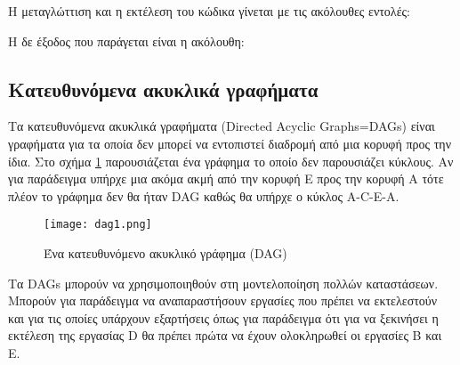 





Η μεταγλώττιση και η εκτέλεση του κώδικα γίνεται με τις ακόλουθες εντολές:



Η δε έξοδος που παράγεται είναι η ακόλουθη:



\subsection{Κατευθυνόμενα ακυκλικά γραφήματα}
Τα κατευθυνόμενα ακυκλικά γραφήματα (Directed Acyclic Graphs=DAGs) είναι γραφήματα για τα οποία δεν μπορεί να εντοπιστεί διαδρομή από μια κορυφή προς την ίδια. Στο σχήμα \ref{fig:dag1} παρουσιάζεται ένα γράφημα το οποίο δεν παρουσιάζει κύκλους. Αν για παράδειγμα υπήρχε μια ακόμα ακμή από την κορυφή E προς την κορυφή A τότε πλέον το γράφημα δεν θα ήταν DAG καθώς θα υπήρχε ο κύκλος A-C-E-A.

\begin{figure}[ht]
	\centering
	\texttt{[image: dag1.png]}
	\caption{Ένα κατευθυνόμενο ακυκλικό γράφημα (DAG)}
	\label{fig:dag1}
\end{figure}

Τα DAGs μπορούν να χρησιμοποιηθούν στη μοντελοποίηση πολλών καταστάσεων. Μπορούν για παράδειγμα να αναπαραστήσουν εργασίες που πρέπει να εκτελεστούν και για τις οποίες υπάρχουν εξαρτήσεις όπως για παράδειγμα ότι για να ξεκινήσει η εκτέλεση της εργασίας D θα πρέπει πρώτα να έχουν ολοκληρωθεί οι εργασίες B και E. 

